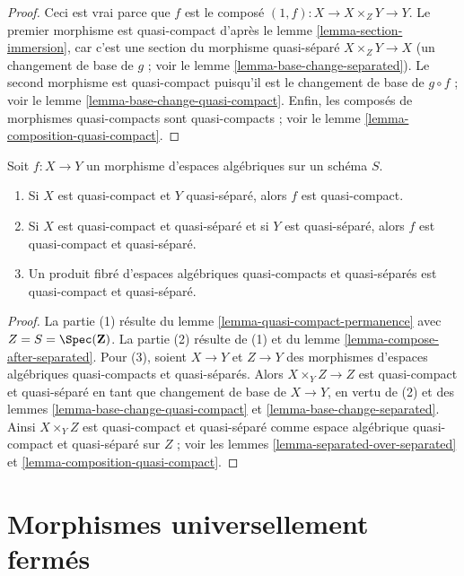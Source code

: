 \begin{proof}
Ceci est vrai parce que $f$ est le composé
$(1, f) : X \to X \times_Z Y \to Y$. Le premier morphisme
est quasi-compact d'après le lemme \ref{lemma-section-immersion},
car c'est une section du morphisme quasi-séparé $X \times_Z Y \to X$
(un changement de base de $g$ ; voir le lemme \ref{lemma-base-change-separated}).
Le second morphisme est quasi-compact puisqu'il
est le changement de base de $g \circ f$ ; voir le
lemme \ref{lemma-base-change-quasi-compact}.
Enfin, les composés de morphismes quasi-compacts
sont quasi-compacts ; voir le lemme \ref{lemma-composition-quasi-compact}.
\end{proof}

\begin{lemma}
\label{lemma-quasi-compact-quasi-separated-permanence}
Soit $f : X \to Y$ un morphisme d'espaces algébriques
sur un schéma $S$.
\begin{enumerate}
\item Si $X$ est quasi-compact et $Y$ quasi-séparé, alors $f$ est
quasi-compact.
\item Si $X$ est quasi-compact et quasi-séparé et si $Y$ est quasi-séparé,
alors $f$ est quasi-compact et quasi-séparé.
\item Un produit fibré d'espaces algébriques quasi-compacts et quasi-séparés
est quasi-compact et quasi-séparé.
\end{enumerate}
\end{lemma}

\begin{proof}
La partie (1) résulte du
lemme \ref{lemma-quasi-compact-permanence}
avec $Z = S = \Spec(\mathbf{Z})$.
La partie (2) résulte de (1) et du
lemme \ref{lemma-compose-after-separated}.
Pour (3), soient $X \to Y$ et $Z \to Y$ des morphismes
d'espaces algébriques quasi-compacts et quasi-séparés. Alors
$X \times_Y Z \to Z$ est quasi-compact et quasi-séparé en tant que
changement de base de $X \to Y$, en vertu de (2) et des
lemmes \ref{lemma-base-change-quasi-compact} et
\ref{lemma-base-change-separated}.
Ainsi $X \times_Y Z$ est quasi-compact et quasi-séparé comme
espace algébrique quasi-compact et quasi-séparé sur
$Z$ ; voir les
lemmes \ref{lemma-separated-over-separated} et
\ref{lemma-composition-quasi-compact}.
\end{proof}


\section{Morphismes universellement fermés}
\label{section-universally-closed}

